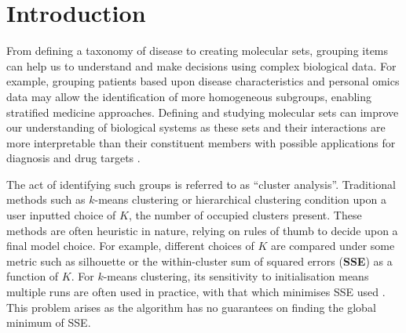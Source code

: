 \documentclass{bioinfo}
\begin{document}
\maketitle

\section{Introduction}

From defining a taxonomy of disease to creating molecular sets, grouping items can help us to understand and make decisions using complex biological data. For example, grouping patients based upon disease characteristics and personal omics data may allow the identification of more homogeneous subgroups, enabling stratified medicine approaches. Defining and studying molecular sets can improve our understanding of biological systems as these sets and their interactions are more interpretable than their constituent members \citep{hejblum2015time} with possible applications for diagnosis and drug targets \citep{bai2013strategic, emmert2014gene}. 




The act of identifying such groups is referred to as “cluster analysis”. Traditional methods such as $k$-means clustering \citep{lloyd1982least, forgy1965cluster} or hierarchical clustering condition upon a user inputted choice of $K$, the number of occupied clusters present.  These methods are often heuristic in nature, relying on rules of thumb to decide upon a final model choice. For example, different choices of $K$ are compared under some metric such as silhouette or the within-cluster sum of squared errors (\textbf{SSE}) as a function of $K$. For $k$-means clustering, its sensitivity to initialisation means multiple runs are often used in practice, with that which minimises SSE used \citep{arthur2006k}. This problem arises as the algorithm has no guarantees on finding the global minimum of SSE.
\end{document}
